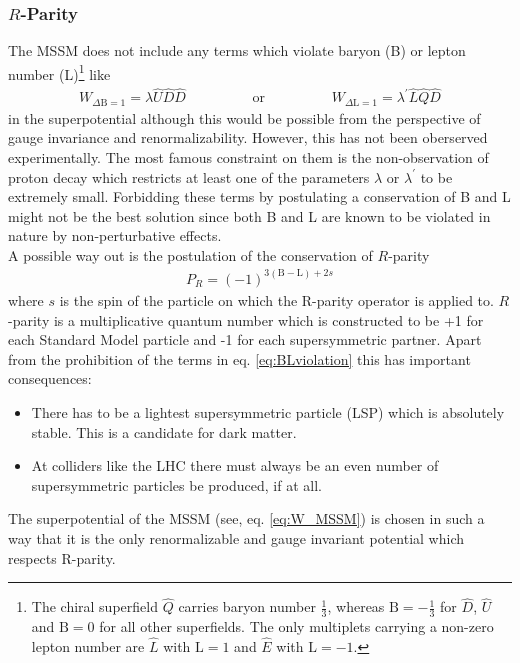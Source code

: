 \subsubsection{$R$-Parity}\label{sec:RParity}
The MSSM does not include any terms which violate baryon (B) or lepton number (L)\footnote{The chiral superfield $\hat{Q}$ carries baryon number $\frac{1}{3}$, whereas $\mathrm{B} = -\frac{1}{3}$ for $\hat{D}$, $\hat{U}$ and $\mathrm{B} = 0$ for all other superfields. The only multiplets carrying a non-zero lepton number are $\hat{L}$ with $\mathrm{L} = 1$ and $\hat{E}$ with $\mathrm{L} = -1$.} like 
\begin{align}
W_{\Delta \mathrm{B}=1} = \lambda \hat{U}\hat{D}\hat{D} \hspace{2cm}\mathrm{or}\hspace{2cm} W_{\Delta \mathrm{L}=1} = \lambda^\prime \hat{L}\hat{Q}\hat{D}\label{eq:BLviolation}
\end{align}
in the superpotential although this would be possible from the perspective of gauge invariance and renormalizability. However, this has not been oberserved experimentally. The most famous constraint on them is the non-observation of proton decay which restricts at least one of the parameters $\lambda$ or $\lambda^\prime$ to be extremely small\cite{Martin:1997ns}. Forbidding these terms by postulating a conservation of B and L might not be the best solution since both B and L are known to be violated in nature by non-perturbative effects\cite{'tHooft:1976up}.\\
A possible way out is the postulation of the conservation of $R$-parity
\begin{align}
P_R = (-1)^{3(\mathrm{B}-\mathrm{L})+2s}
\end{align}
where $s$ is the spin of the particle on which the R-parity operator is applied to. $R$-parity is a multiplicative quantum number which is constructed to be +1 for each Standard Model particle and -1 for each supersymmetric partner. Apart from the prohibition of the terms in eq. \eqref{eq:BLviolation} this has important consequences:
\begin{itemize}
\item There has to be a lightest supersymmetric particle (LSP) which is absolutely stable. This is a candidate for dark matter.
\item At colliders like the LHC there must always be an even number of supersymmetric particles be produced, if at all.
\end{itemize}
The superpotential of the MSSM (see, eq. \eqref{eq:W_MSSM}) is chosen in such a way that it is the only renormalizable and gauge invariant potential which respects R-parity.
